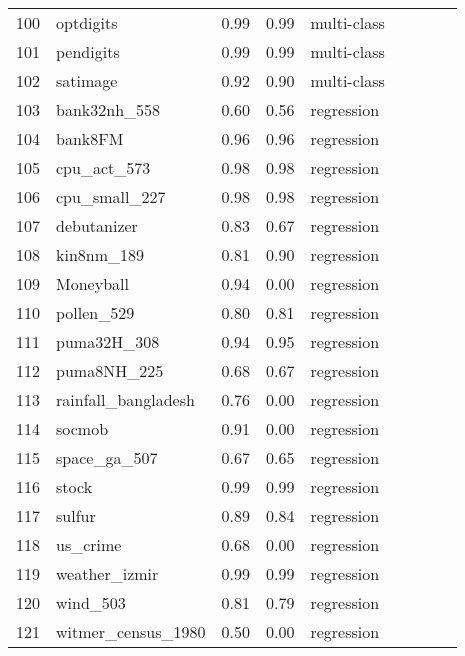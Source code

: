 \begin{table*}
\begin{tabular}{lllllllll}
100 & optdigits            & 0.99 & 0.99 & multi-class \\
101 & pendigits            & 0.99 & 0.99 & multi-class \\
102 & satimage             & 0.92 & 0.90 & multi-class \\
103 & bank32nh\_558        & 0.60 & 0.56 & regression  \\
104 & bank8FM              & 0.96 & 0.96 & regression  \\
105 & cpu\_act\_573        & 0.98 & 0.98 & regression  \\
106 & cpu\_small\_227      & 0.98 & 0.98 & regression  \\
107 & debutanizer          & 0.83 & 0.67 & regression  \\
108 & kin8nm\_189          & 0.81 & 0.90 & regression  \\
109 & Moneyball            & 0.94 & 0.00 & regression  \\
110 & pollen\_529          & 0.80 & 0.81 & regression  \\
111 & puma32H\_308         & 0.94 & 0.95 & regression  \\
112 & puma8NH\_225         & 0.68 & 0.67 & regression  \\
113 & rainfall\_bangladesh & 0.76 & 0.00 & regression  \\
114 & socmob               & 0.91 & 0.00 & regression  \\
115 & space\_ga\_507       & 0.67 & 0.65 & regression  \\
116 & stock                & 0.99 & 0.99 & regression  \\
117 & sulfur               & 0.89 & 0.84 & regression  \\
118 & us\_crime            & 0.68 & 0.00 & regression  \\
119 & weather\_izmir       & 0.99 & 0.99 & regression  \\
120 & wind\_503            & 0.81 & 0.79 & regression  \\
121 & witmer\_census\_1980 & 0.50 & 0.00 & regression  \\
\bottomrule
\end{tabular}

\label{tab:detailed_scores_volcano}
\end{table*}

